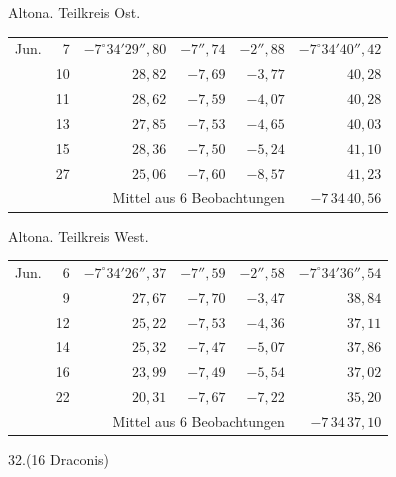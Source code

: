 \noindent\begin{minipage}[t]{.495\textwidth}\centering Altona. Teilkreis Ost.\par\smallskip
{\scriptsize\setlength{\tabcolsep}{1pt}\renewcommand{\arraystretch}{1.2}\begin{tabular}{lr|r|r|r|r|}
Jun.&7&$-7^\circ34'29''{,}80$&$-7''{,}74$&$-2''{,}88$&$-7^\circ34'40''{,}42$\\
&10&$28{,}82$&$-7{,}69$&$-3{,}77$&$40{,}28$\\
&11&$28{,}62$&$-7{,}59$&$-4{,}07$&$40{,}28$\\
&13&$27{,}85$&$-7{,}53$&$-4{,}65$&$40{,}03$\\
&15&$28{,}36$&$-7{,}50$&$-5{,}24$&$41{,}10$\\
&27&$25{,}06$&$-7{,}60$&$-8{,}57$&$41{,}23$\\
\cline{6-6}\multicolumn{5}{r}{Mittel aus 6 Beobachtungen}&$-7\,34\,40{,}56$
\end{tabular}}\end{minipage}\hfill\begin{minipage}[t]{.495\textwidth}\centering Altona. Teilkreis West.\par\smallskip
{\scriptsize\setlength{\tabcolsep}{1pt}\renewcommand{\arraystretch}{1.2}\begin{tabular}{lr|r|r|r|r}
Jun.&6&$-7^\circ34'26''{,}37$&$-7''{,}59$&$-2''{,}58$&$-7^\circ34'36''{,}54$\\
&9&$27{,}67$&$-7{,}70$&$-3{,}47$&$38{,}84$\\
&12&$25{,}22$&$-7{,}53$&$-4{,}36$&$37{,}11$\\
&14&$25{,}32$&$-7{,}47$&$-5{,}07$&$37{,}86$\\
&16&$23{,}99$&$-7{,}49$&$-5{,}54$&$37{,}02$\\
&22&$20{,}31$&$-7{,}67$&$-7{,}22$&$35{,}20$\\
\cline{6-6}\multicolumn{5}{r}{Mittel aus 6 Beobachtungen}&$-7\,34\,37{,}10$
\end{tabular}}\end{minipage}
\par\vspace{4mm}
\begin{center}32.\quad (16 Draconis)\end{center}

